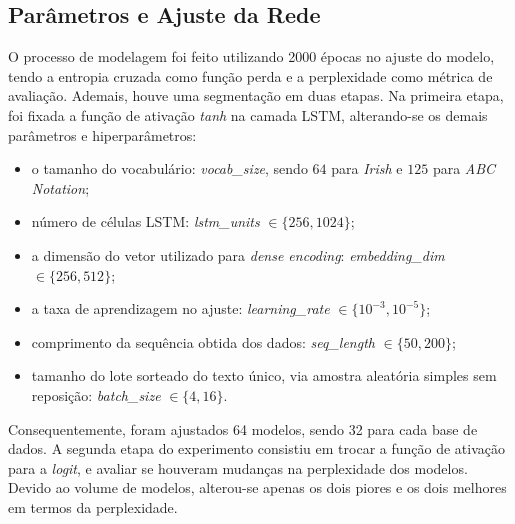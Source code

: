 \documentclass{automatextcc}
\begin{document}
\subsection{Parâmetros e Ajuste da Rede}
O processo de modelagem foi feito utilizando 2000 épocas no ajuste do modelo, tendo a entropia cruzada como função perda e a perplexidade como métrica de avaliação. Ademais, houve uma segmentação em duas etapas. Na primeira etapa, foi fixada a função de ativação \textit{tanh} na camada LSTM, alterando-se os demais parâmetros e hiperparâmetros: 
\begin{itemize}
    \item o tamanho do vocabulário: \textit{vocab\_size}, sendo $64$ para \textit{Irish} e $125$ para \textit{ABC Notation};
    \item número de células LSTM: \textit{lstm\_units} $\in \{256,1024\}$;
    \item a dimensão do vetor utilizado para \textit{dense encoding}: \textit{embedding\_dim} $\in \{256,512\}$;
    \item a taxa de aprendizagem no ajuste: \textit{learning\_rate} $\in \{10^{-3},10^{-5}\}$;
    \item comprimento da sequência obtida dos dados: \textit{seq\_length} $\in \{50,200\}$;
    \item tamanho do lote sorteado do texto único, via amostra aleatória simples sem reposição: \textit{batch\_size} $\in \{4,16\}$.
\end{itemize}
Consequentemente, foram ajustados 64 modelos, sendo 32 para cada base de dados. A segunda etapa do experimento consistiu em trocar a função de ativação para a \textit{logit}, e avaliar se houveram mudanças na perplexidade dos modelos. Devido ao volume de modelos, alterou-se apenas os dois piores e os dois melhores em termos da perplexidade.




\end{document}
